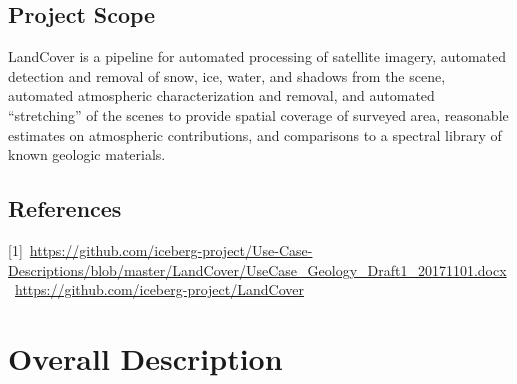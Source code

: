 \documentclass{scrreprt}
\begin{document}
\section{Project Scope}

LandCover is a pipeline for automated processing of satellite imagery, automated 
detection and removal of snow, ice, water, and shadows from the scene, automated 
atmospheric characterization and removal, and automated ``stretching'' of the 
scenes to provide spatial coverage of surveyed area, reasonable estimates on 
atmospheric contributions, and comparisons to a spectral library of known geologic 
materials.

\section{References}
[1]~\url{https://github.com/iceberg-project/Use-Case-Descriptions/blob/master/LandCover/UseCase_Geology_Draft1_20171101.docx}\newline
[2]~\url{https://github.com/iceberg-project/LandCover}

\chapter{Overall Description}
\end{document}
